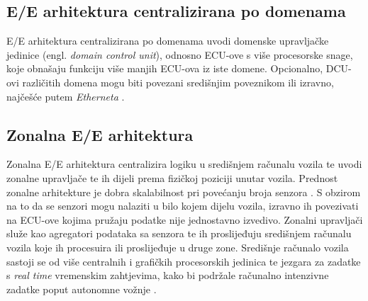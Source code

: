 \documentclass[times, utf8, diplomski, numeric]{fer}
\begin{document}
\subsection{E/E arhitektura centralizirana po domenama}
E/E arhitektura centralizirana po domenama uvodi domenske upravljačke jedinice (engl. \textit{domain control unit}), odnosno ECU-ove s više procesorske snage, koje obnašaju funkciju više manjih ECU-ova iz iste domene. Opcionalno, DCU-ovi različitih domena mogu biti povezani središnjim poveznikom ili izravno, najčešće putem \textit{Etherneta} \cite{bosch2022handbook, nasser2023automotive}.

\subsection{Zonalna E/E arhitektura}
Zonalna E/E arhitektura centralizira logiku u središnjem računalu vozila  te uvodi zonalne upravljače te ih dijeli prema fizičkoj poziciji unutar vozila. Prednost zonalne arhitekture je dobra skalabilnost pri povećanju broja senzora \cite{bosch2022handbook}. S obzirom na to da se senzori mogu nalaziti u bilo kojem dijelu vozila, izravno ih povezivati na ECU-ove kojima pružaju podatke nije jednostavno izvedivo. Zonalni upravljači služe kao agregatori podataka sa senzora te ih proslijeđuju središnjem računalu vozila koje ih procesuira ili proslijeđuje u druge zone. Središnje računalo vozila sastoji se od više centralnih i grafičkih procesorskih jedinica te jezgara za zadatke s \textit{real time} vremenskim zahtjevima, kako bi podržale računalno intenzivne zadatke poput autonomne vožnje \cite{nasser2023automotive}.
\end{document}
